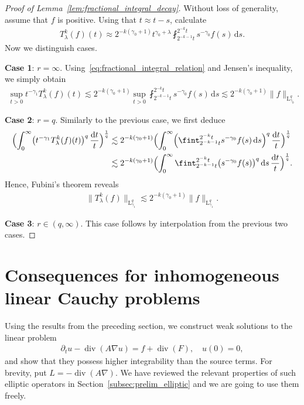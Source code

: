 \documentclass[11pt, leqno]{amsart}
\theoremstyle{definition}
\renewcommand{\L}{\mathrm{L}}
\renewcommand{\d}{\,\mathrm{d}}
\newcommand{\ddt}{\,\frac{\mathrm{d}t}{t}}
\DeclareMathOperator{\Div}{div}
\begin{document}
	\begin{proof}[Proof of Lemma~\ref{lem:fractional_integral_decay}]
		Without loss of generality, assume that $f$ is positive. Using that $t \approx t-s$, calculate
		\begin{align}
			T_\lambda^k(f)(t) \approx 2^{-k(\gamma_0 + 1)} t^{\gamma_0 + \lambda} \fint_{2^{-k-1}t}^{2^{-k}t} s^{-\gamma_0} f(s) \d s.
		\end{align}
		Now we distinguish cases.

		\textbf{Case 1}: $r = \infty$. Using~\eqref{eq:fractional_integral_relation} and Jensen's inequality, we simply obtain
		\begin{align}
			\sup_{t>0} t^{-\gamma_1} T_\lambda^k(f)(t) \lesssim 2^{-k(\gamma_0 + 1)} \sup_{t > 0} \fint_{2^{-k-1}t}^{2^{-k}t} s^{-\gamma_0} f(s) \d s \lesssim 2^{-k(\gamma_0 + 1)} \| f \|_{\L^q_{\gamma_0}}.
		\end{align}

		\textbf{Case 2}: $r = q$. Similarly to the previous case, we first deduce
		\begin{align}
			\Bigl( \int_0^\infty \bigl( t^{-\gamma_1} T_\lambda^k(f)(t) \bigr)^q \ddt \Bigr)^\frac{1}{q} &\lesssim 2^{-k(\gamma_0 + 1)} \Bigl( \int_0^\infty \Bigl( \fint_{2^{-k-1}t}^{2^{-k}t} s^{-\gamma_0} f(s) \d s \Bigr)^q \ddt \Bigr)^\frac{1}{q} \\
			&\lesssim 2^{-k(\gamma_0 + 1)} \Bigl( \int_0^\infty \fint_{2^{-k-1}t}^{2^{-k}t} \bigl( s^{-\gamma_0} f(s) \bigr)^q \d s \ddt \Bigr)^\frac{1}{q}.
		\end{align}
		Hence, Fubini's theorem reveals
		\begin{align}
			\| T_\lambda^k(f) \|_{\L^q_{\gamma_1}} \lesssim 2^{-k(\gamma_0 + 1)} \| f \|_{\L^q_{\gamma_1}}.
		\end{align}

		\textbf{Case 3}: $r \in (q,\infty)$. This case follows by interpolation from the previous two cases.
	\end{proof}


	\section{Consequences for inhomogeneous linear Cauchy problems}
	\label{subsec:duhamel_cauchy}

	Using the results from the preceding section, we construct weak solutions to the linear problem
	\begin{align}
		\label{eq:LP}
		\tag{LP}
		\partial_t u - \Div(A\nabla u) = f + \Div(F), \quad u(0) = 0,
	\end{align}
	and show that they possess higher integrability than the source terms.
	For brevity, put $L = -\Div(A\nabla)$. We have reviewed the relevant properties of such elliptic operators in Section~\ref{subsec:prelim_elliptic} and we are going to use them freely.
\end{document}
